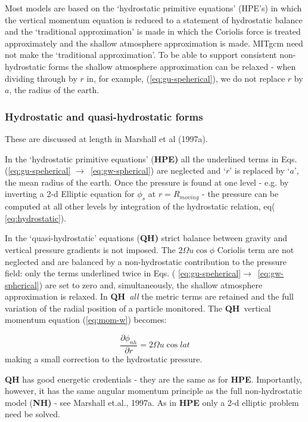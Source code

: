 \documentclass[12pt]{book}
\begin{document}
Most models are based on the `hydrostatic primitive equations' (HPE's) in
which the vertical momentum equation is reduced to a statement of
hydrostatic balance and the `traditional approximation' is made in which the
Coriolis force is treated approximately and the shallow atmosphere
approximation is made.  MITgcm need not make the `traditional
approximation'. To be able to support consistent non-hydrostatic forms the
shallow atmosphere approximation can be relaxed - when dividing through by $
r $ in, for example, (\ref{eq:gu-speherical}), we do not replace $r$ by $a$,
the radius of the earth.

\subsubsection{Hydrostatic and quasi-hydrostatic forms}

These are discussed at length in Marshall et al (1997a).

In the `hydrostatic primitive equations' (\textbf{HPE)} all the underlined
terms in Eqs. (\ref{eq:gu-speherical} $\rightarrow $\ \ref{eq:gw-spherical})
are neglected and `${r}$' is replaced by `$a$', the mean radius of the
earth. Once the pressure is found at one level - e.g. by inverting a 2-d
Elliptic equation for $\phi _{s}$ at $r=R_{moving}$ - the pressure can be
computed at all other levels by integration of the hydrostatic relation, eq(
\ref{eq:hydrostatic}).

In the `quasi-hydrostatic' equations (\textbf{QH)} strict balance between
gravity and vertical pressure gradients is not imposed. The $2\Omega u\cos
\phi $ Coriolis term are not neglected and are balanced by a non-hydrostatic
contribution to the pressure field: only the terms underlined twice in Eqs. (
\ref{eq:gu-speherical}$\rightarrow $\ \ref{eq:gw-spherical}) are set to zero
and, simultaneously, the shallow atmosphere approximation is relaxed. In 
\textbf{QH}\ \textit{all} the metric terms are retained and the full
variation of the radial position of a particle monitored. The \textbf{QH}\
vertical momentum equation (\ref{eq:mom-w}) becomes:

\begin{equation*}
\frac{\partial \phi _{nh}}{\partial r}=2\Omega u\cos lat
\end{equation*}
making a small correction to the hydrostatic pressure.

\textbf{QH} has good energetic credentials - they are the same as for 
\textbf{HPE}. Importantly, however, it has the same angular momentum
principle as the full non-hydrostatic model (\textbf{NH)} - see Marshall
et.al., 1997a. As in \textbf{HPE }only a 2-d elliptic problem need be solved.
\end{document}
